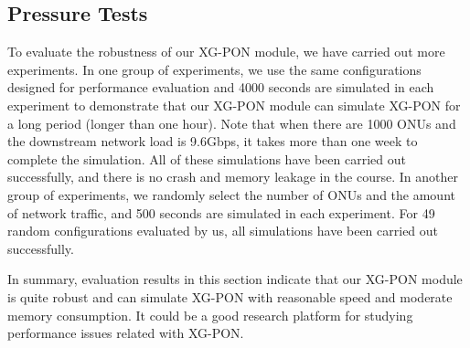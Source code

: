 \subsection{Pressure Tests}

To evaluate the robustness of our XG-PON module, we have carried
out more experiments. In one group of experiments, we use the same
configurations designed for performance evaluation and 4000
seconds are simulated in each experiment to demonstrate that our
XG-PON module can simulate XG-PON for a long period (longer than
one hour). Note that when there are 1000 ONUs and the downstream
network load is 9.6Gbps, it takes more than one week to complete
the simulation. All of these simulations have been carried out
successfully, and there is no crash and memory leakage in the
course. In another group of experiments, we randomly select the
number of ONUs and the amount of network traffic, and 500 seconds
are simulated in each experiment. For 49 random configurations
evaluated by us, all simulations have been carried out
successfully.

In summary, evaluation results in this section indicate that our
XG-PON module is quite robust and can simulate XG-PON with
reasonable speed and moderate memory consumption. It could be a
good research platform for studying performance issues related
with XG-PON.
